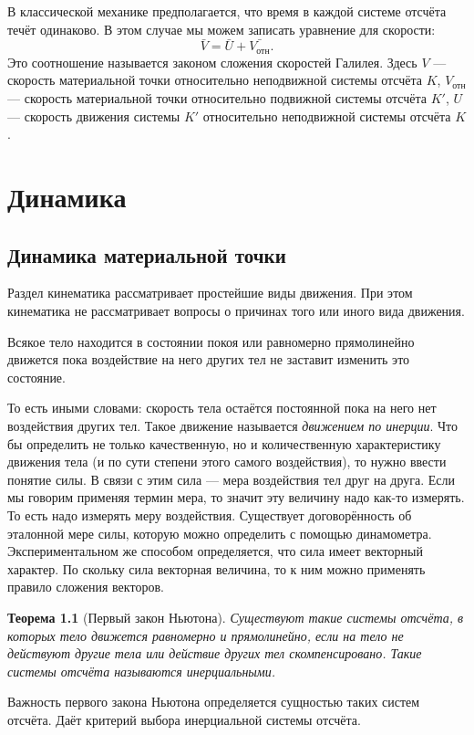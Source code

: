 \documentclass[10pt]{scrbook}
\newtheorem{theorem}{Теорема}[section]
\begin{document}
В классической механике предполагается, что время в каждой системе отсчёта
течёт одинаково. В этом случае мы можем записать уравнение для скорости: \[
	\bar{V} = \bar{U} + \bar{V_\text{отн}}
	.\] Это соотношение называется законом сложения скоростей Галилея. Здесь \(
V \) --- скорость материальной точки относительно неподвижной системы отсчёта
\( K \), \( V_\text{отн} \) --- скорость материальной точки относительно
подвижной системы отсчёта \( K' \), \( U \) --- скорость движения системы \(
K' \) относительно неподвижной системы отсчёта \( K \).

\chapter{Динамика}
\section{Динамика материальной точки}%

Раздел кинематика рассматривает простейшие виды движения. При этом кинематика
не рассматривает вопросы о причинах того или иного вида движения.

Всякое тело находится в состоянии покоя или равномерно прямолинейно движется
пока воздействие на него других тел не заставит изменить это состояние.

То есть иными словами: скорость тела остаётся постоянной пока на него нет
воздействия других тел. Такое движение называется \emph{движением по инерции}.
Что бы определить не только качественную, но и количественную характеристику
движения тела (и по сути степени этого самого воздействия), то нужно ввести
понятие силы. В связи с этим сила --- мера воздействия тел друг на друга. Если мы
говорим применяя термин мера, то значит эту величину надо как-то измерять. То
есть надо измерять меру воздействия. Существует договорённость об эталонной
мере силы, которую можно определить с помощью динамометра. Экспериментальном
же способом определяется, что сила имеет векторный характер. По скольку сила
векторная величина, то к ним можно применять правило сложения векторов.

\begin{theorem}[Первый закон Ньютона]
	Существуют такие системы отсчёта, в которых тело движется равномерно и
	прямолинейно, если на тело не  действуют другие тела или действие других тел
	скомпенсировано. Такие системы отсчёта называются инерциальными.
\end{theorem}

Важность первого закона Ньютона определяется сущностью таких систем отсчёта.
Даёт критерий выбора инерциальной системы отсчёта.
\end{document}
